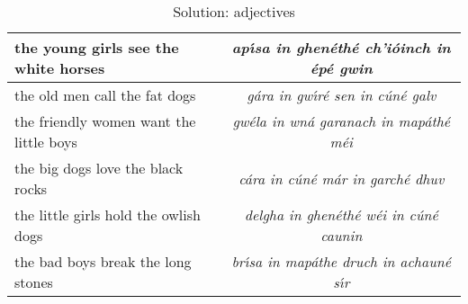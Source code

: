 \begin{table}[H]
{\begin{tabular}{|l|>{\itshape}c|}
    \midrule
    the young girls see the white horses & ap\'{\i}sa in ghen\'{e}th\'{e} ch'i\'{o}inch in \'{e}p\'{e} gwin\\
    \midrule
    the old men call the fat dogs & g\'{a}ra in gw\'{\i}r\'{e} sen in c\'{u}n\'{e} galv\\
    \midrule
    the friendly women want the little boys & gw\'{e}la in wn\'{a} garanach in map\'{a}th\'{e} m\'{e}i\\
    \midrule
    the big dogs love the black rocks & c\'{a}ra in c\'{u}n\'{e} m\'{a}r in garch\'{e} dhuv\\
    \midrule
    the little girls hold the owlish dogs & delgha in ghen\'{e}th\'{e} w\'{e}i in c\'{u}n\'{e} caunin\\
    \midrule
    the bad boys break the long stones & br\'{\i}sa in map\'{a}the druch in achaun\'{e} s\'{\i}r\\
    \bottomrule
  \end{tabular}
}
\label{solution_adjectives}
\caption{Solution: adjectives}
\end{table}
